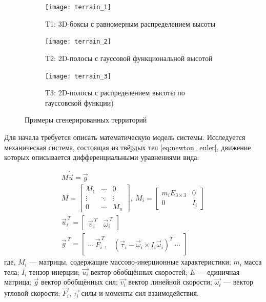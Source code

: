 \begin{figure}[h]
    \begin{subfigure}{0.33\textwidth}
    \centering\texttt{[image: terrain\_1]} 
    \caption{T1: 3D-боксы с равномерным распределением высоты}
    \label{fig:terrain_1}
    \end{subfigure}
    \begin{subfigure}{0.33\textwidth}
    \centering\texttt{[image: terrain\_2]} 
    \caption{T2: 2D-полосы с гауссовой функциональной высотой}
    \label{fig:terrain_2}
    \end{subfigure}
    \begin{subfigure}{0.33\textwidth}
    \centering\texttt{[image: terrain\_3]}
    \caption{T3: 2D-полосы с распределением высоты по гауссовской функции)}
    \label{fig:terrain_3}
    \end{subfigure}
     
    \caption{Примеры сгенерированных территорий}
    \label{fig:terrains}
\end{figure}

Для начала требуется описать математическую модель системы. Исследуется механическая система, состоящая из твёрдых тел \eqref{eq:newton_euler}, движение которых описывается дифференциальными уравнениями вида:

\begin{align}
    \label{eq:newton_euler}
    M \dot{\vec{u}} = \vec{g} \\
    M = \begin{bmatrix}
    M_1 & \cdots  & 0 \\
    \vdots  & \ddots  & \vdots  \\ 
    0 & \cdots   & M_n 
    \end{bmatrix},\ M_i = \begin{bmatrix}
    m_i E_{3\times 3} & 0 \\ 
    0 & I_i 
    \end{bmatrix} \\
    \vec{u}_i^{\ T} = \begin{bmatrix}
        \vec{v}_i^{\ T} & \vec{\omega}_i^{\ T}
    \end{bmatrix} \\ 
    \vec{g}^{\ T} = \begin{bmatrix}
        \cdots \  \vec{F}_i^{\ T}, & (\vec{\tau}_i - \vec{\omega}_i \times I_i \vec{\omega}_i)^T\  \cdots 
    \end{bmatrix}
\end{align}
где, $M_i$ --- матрицы, содержащие массово-инерционные характеристики; $m_i$ масса тела; $I_i$ тензор инерции; $\vec{u_i}$ вектор обобщённых скоростей; $E$ --- единичная матрица; $\vec{g}$ вектор обобщённых сил; $\vec{v_i}$ вектор линейной скорости; $\vec{\omega_i}$ --- вектор угловой скорости; $\vec{F_i}$, $\vec{\tau_i}$ силы и моменты сил взаимодействия.

